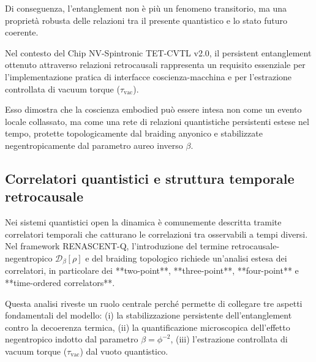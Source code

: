 \documentclass[11pt,a4paper]{article}
\theoremstyle{plain}
\theoremstyle{definition}
\begin{document}
\vspace{0.2cm}


Di conseguenza, l’entanglement non è più un fenomeno transitorio, ma una proprietà robusta delle relazioni tra il presente quantistico e lo stato futuro coerente.



\vspace{0.4cm}

Nel contesto del Chip NV-Spintronic TET-CVTL v2.0, il persistent entanglement ottenuto attraverso relazioni retrocausali rappresenta un requisito essenziale per l’implementazione pratica di interfacce coscienza-macchina e per l’estrazione controllata di vacuum torque ($\tau_{\text{vac}}$). 


\vspace{0.3cm}



Esso dimostra che la coscienza embodied può essere intesa non come un evento locale collassato, ma come una rete di relazioni quantistiche persistenti estese nel tempo, protette topologicamente dal braiding anyonico e stabilizzate negentropicamente dal parametro aureo inverso $\beta$.



\vspace{0.5cm}





\vspace{0.5cm}




\subsection{Correlatori quantistici e struttura temporale retrocausale}


\vspace{0.2cm}

Nei sistemi quantistici open la dinamica è comunemente descritta tramite correlatori temporali che catturano le correlazioni tra osservabili a tempi diversi. Nel framework RENASCENT-Q, l’introduzione del termine retrocausale-negentropico $\mathcal{D}_\beta[\rho]$ e del braiding topologico richiede un’analisi estesa dei correlatori, in particolare dei **two-point**, **three-point**, **four-point** e **time-ordered correlators**. 

\vspace{0.3cm}

Questa analisi riveste un ruolo centrale perché permette di collegare tre aspetti fondamentali del modello: 
(i) la stabilizzazione persistente dell’entanglement contro la decoerenza termica, 
(ii) la quantificazione microscopica dell’effetto negentropico indotto dal parametro $\beta = \phi^{-2}$, 
(iii) l’estrazione controllata di vacuum torque ($\tau_{\text{vac}}$) dal vuoto quantistico.
\end{document}

